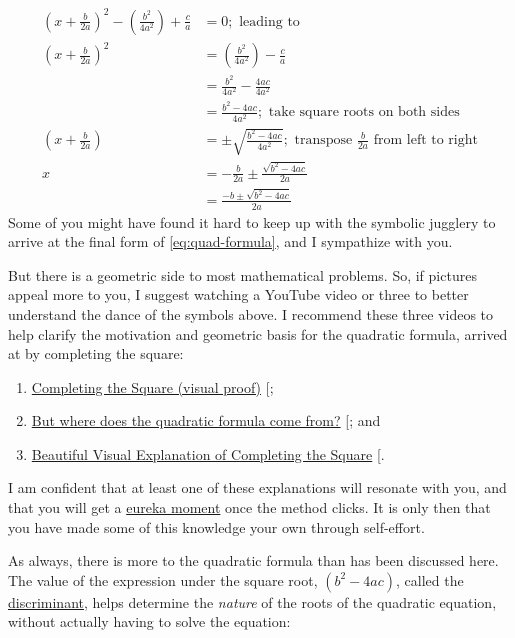 \documentclass[
  a4paper,
]{article}
\begin{document}
\begin{enumerate}
\begin{equation}
{\begin{aligned}
  \left(x + \frac{b}{2a}\right)^2 - \left(\frac{b^2}{4a^2}\right) + \frac{c}{a} &= 0; \text{ leading to}\\
  \left(x + \frac{b}{2a}\right)^2 &= \left(\frac{b^2}{4a^2}\right) - \frac{c}{a}\\
  &= \frac{b^2}{4a^2} - \frac{4ac}{4a^2}\\
  &= \frac{b^2 - 4ac}{4a^2}; \text{ take square roots on both sides}\\
  \left(x + \frac{b}{2a}\right) &= \pm\sqrt{\frac{b^2 - 4ac}{4a^2}}; \text{ transpose $\frac{b}{2a}$ from left to right}\\
  x &= -\frac{b}{2a} \pm \frac{\sqrt{b^2 - 4ac}}{2a}\\
  &=\frac{-{b} \pm \sqrt{b^2 - 4ac}}{2a}
  \end{aligned}
  }\end{equation} Some of you might have found it hard to keep up with
  the symbolic jugglery to arrive at the final form of
  \cref{eq:quad-formula}, and I sympathize with you.
\end{enumerate}

But there is a geometric side to most mathematical problems. So, if
pictures appeal more to you, I suggest watching a YouTube video or three
to better understand the dance of the symbols above. I recommend these
three videos to help clarify the motivation and geometric basis for the
quadratic formula, arrived at by completing the square:

\begin{enumerate}
\def\labelenumi{\alph{enumi}.}
\item
  \href{https://www.youtube.com/watch?v=T0HyWIFbsHQ}{Completing the
  Square (visual proof)} {[}\citeproc{ref-mvp-2022}{2}{]};
\item
  \href{https://www.youtube.com/watch?v=7Q4h1YTYgnE}{But where does the
  quadratic formula come from?}
  {[}\citeproc{ref-foggy-maths-2023}{3}{]}; and
\item
  \href{https://www.youtube.com/watch?v=McDdEw_Fb5E}{Beautiful Visual
  Explanation of Completing the Square}
  {[}\citeproc{ref-woo-2016}{4}{]}.
\end{enumerate}

I am confident that at least one of these explanations will resonate
with you, and that you will get a
\href{https://nesslabs.com/eureka-moments}{eureka moment} once the
method clicks. It is only then that you have made some of this knowledge
your own through self-effort.

As always, there is more to the quadratic formula than has been
discussed here. The value of the expression under the square root,
\((b^2 - 4ac)\), called the
\href{https://www.britannica.com/science/discriminant}{discriminant},
helps determine the \emph{nature} of the roots of the quadratic
equation, without actually having to solve the equation:
\end{document}
